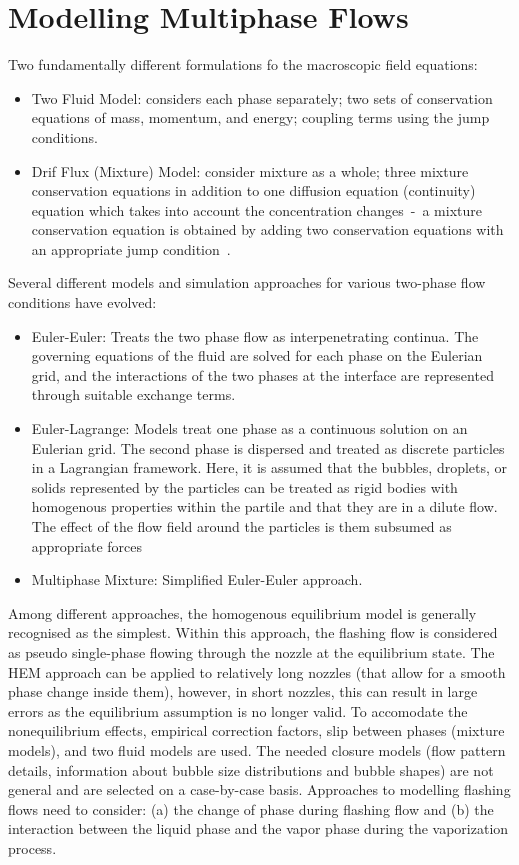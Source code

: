 \documentclass[11pt]{article}
\begin{document}
\section{Modelling Multiphase Flows}
Two fundamentally different formulations fo the macroscopic field equations:
\begin{itemize}
\item Two Fluid Model: considers each phase separately; two sets of conservation equations of mass, momentum, and energy; coupling terms using the jump conditions.
\item Drif Flux (Mixture) Model: consider mixture as a whole; three mixture conservation equations in addition to one diffusion equation (continuity) equation which takes into account the concentration changes~-~a mixture conservation equation is obtained by adding two conservation equations with an appropriate jump condition~\cite{ishiiThermoFluidDynamicsTwoPhase2011}. 
\end{itemize}
Several different models and simulation approaches for various two-phase flow conditions have evolved:
\begin{itemize}
\item Euler-Euler: Treats the two phase flow as interpenetrating continua. The governing equations of the fluid are solved for each phase on the Eulerian grid, and the interactions of the two phases at the interface are represented through suitable exchange terms.
\item Euler-Lagrange: Models treat one phase as a continuous solution on an Eulerian grid. The second phase is dispersed and treated as discrete particles in a Lagrangian framework. Here, it is assumed that the bubbles, droplets, or solids represented by the particles can be treated as rigid bodies with homogenous properties within the partile and that they are in a dilute flow. The effect of the flow field around the particles is them subsumed as appropriate forces~\cite{Gartner2024-zh}
\item Multiphase Mixture: Simplified Euler-Euler approach. 
\end{itemize}

Among different approaches, the homogenous equilibrium model is generally recognised as the simplest.
Within this approach, the flashing flow is considered as pseudo single-phase flowing through the nozzle at the equilibrium state.
The HEM approach can be applied to relatively long nozzles (that allow for a smooth phase change inside them), however, in short nozzles, this can result in large errors as the equilibrium assumption is no longer valid.
To accomodate the nonequilibrium effects, empirical correction factors, slip between phases (mixture models), and two fluid models are used. The needed closure models (flow pattern details, information about bubble size distributions and bubble shapes) are not general and are selected on a case-by-case basis.
Approaches to modelling flashing flows need to consider: (a) the change of phase during flashing flow and (b) the interaction between the liquid phase and the vapor phase during the vaporization process.~\cite{dangleComputationalFluidDynamics2018}
\end{document}
